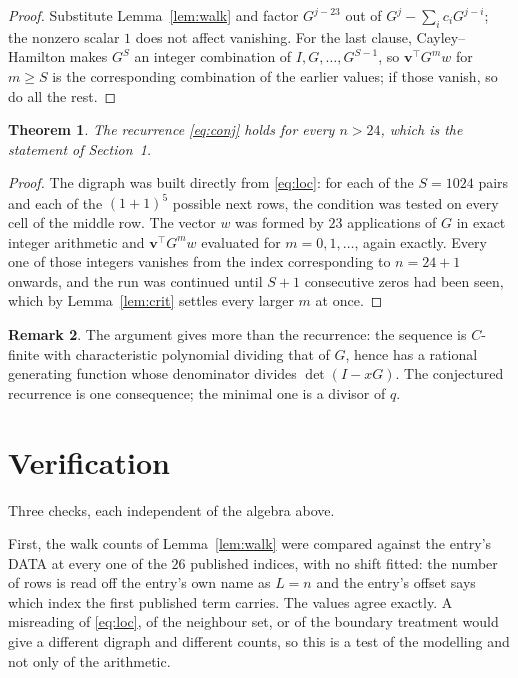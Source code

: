 \documentclass[11pt,a4paper]{article}
\theoremstyle{plain}
\newtheorem{theorem}{Theorem}
\theoremstyle{definition}
\newtheorem{remark}[theorem]{Remark}
\begin{document}
\begin{proof}
Substitute Lemma~\ref{lem:walk} and factor $G^{j-23}$ out of
$G^{j}-\sum_ic_iG^{j-i}$; the nonzero scalar $1$ does not affect
vanishing. For the last clause, Cayley--Hamilton makes $G^{S}$ an integer combination of
$I,G,\dots,G^{S-1}$, so $\mathbf{v}^{\!\top}G^{m}w$ for $m\ge S$ is the corresponding
combination of the earlier values; if those vanish, so do all the rest.
\end{proof}

\begin{theorem}
The recurrence \eqref{eq:conj} holds for every $n>24$, which is the statement of
Section~1.
\end{theorem}

\begin{proof}
The digraph was built directly from \eqref{eq:loc}: for each of the $S=1024$ pairs and each
of the $(1+1)^{5}$ possible next rows, the condition was tested on every cell of
the middle row. The vector $w$ was formed by $23$ applications of $G$ in exact integer
arithmetic and $\mathbf{v}^{\!\top}G^{m}w$ evaluated for $m=0,1,\dots$, again exactly.
Every one of those integers vanishes from the index corresponding to $n=24+1$ onwards,
and the run was continued until $S+1$ consecutive zeros had been seen, which by
Lemma~\ref{lem:crit} settles every larger $m$ at once.
\end{proof}

\begin{remark}
The argument gives more than the recurrence: the sequence is $C$-finite with characteristic
polynomial dividing that of $G$, hence has a rational generating function whose denominator
divides $\det(I-xG)$. The conjectured recurrence is one consequence; the minimal one is a
divisor of $q$.
\end{remark}

\section{Verification}

Three checks, each independent of the algebra above.

First, the walk counts of Lemma~\ref{lem:walk} were compared against the entry's DATA at
every one of the $26$ published indices, with no shift fitted: the number of rows is
read off the entry's own name as $L=n$ and the entry's offset says which index the first
published term carries. The values agree exactly. A misreading of \eqref{eq:loc}, of the
neighbour set, or of the boundary treatment would give a different digraph and different
counts, so this is a test of the modelling and not only of the arithmetic.
\end{document}
